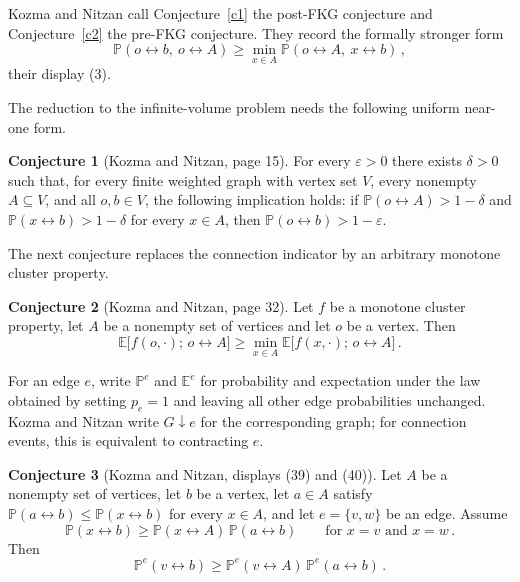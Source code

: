 \documentclass[11pt]{article}
\theoremstyle{definition}
\newtheorem{conjecture}{Conjecture}
\theoremstyle{remark}
\newcommand{\PP}{\mathbb P}
\newcommand{\EE}{\mathbb E}
\newcommand{\con}{\leftrightarrow}
\begin{document}
Kozma and Nitzan call Conjecture~\ref{c1} the post-FKG conjecture and Conjecture~\ref{c2}
the pre-FKG conjecture. They record the formally stronger form
\begin{equation}\label{eq:pre}
 \PP(o\con b,\ o\con A)\geq \min_{x\in A}\PP(o\con A,\ x\con b)\,,
\end{equation}
their display (3).

The reduction to the infinite-volume problem needs the following uniform near-one form.

\begin{conjecture}[Kozma and Nitzan, page 15]\label{c3}
For every $\varepsilon>0$ there exists $\delta>0$ such that, for every finite weighted graph
with vertex set $V$, every nonempty $A\subseteq V$, and all $o,b\in V$, the following
implication holds: if $\PP(o\con A)>1-\delta$ and $\PP(x\con b)>1-\delta$ for every
$x\in A$, then $\PP(o\con b)>1-\varepsilon$.
\end{conjecture}

The next conjecture replaces the connection indicator by an arbitrary monotone cluster
property.

\begin{conjecture}[Kozma and Nitzan, page 32]\label{c4}
Let $f$ be a monotone cluster property, let $A$ be a nonempty set of vertices and let $o$
be a vertex. Then
\[
 \EE\bigl[f(o,\cdot);\,o\con A\bigr]\geq \min_{x\in A}\EE\bigl[f(x,\cdot);\,o\con A\bigr]\,.
\]
\end{conjecture}

For an edge $e$, write $\PP^e$ and $\EE^e$ for probability and expectation under the law
obtained by setting $p_e=1$ and leaving all other edge probabilities unchanged. Kozma and
Nitzan write $G\downarrow e$ for the corresponding graph; for connection events, this is
equivalent to contracting $e$.

\setcounter{conjecture}{5}
\begin{conjecture}[Kozma and Nitzan, displays (39) and (40)]\label{c6}
Let $A$ be a nonempty set of vertices, let $b$ be a vertex, let $a\in A$ satisfy
$\PP(a\con b)\leq\PP(x\con b)$ for every $x\in A$, and let $e=\{v,w\}$ be an edge. Assume
\begin{equation}\label{eq:39}
 \PP(x\con b)\geq \PP(x\con A)\,\PP(a\con b)\qquad\text{for } x=v \text{ and } x=w\,.
\end{equation}
Then
\begin{equation}\label{eq:40}
 \PP^e(v\con b)\geq \PP^e(v\con A)\,\PP^e(a\con b)\,.
\end{equation}
\end{conjecture}
\end{document}
